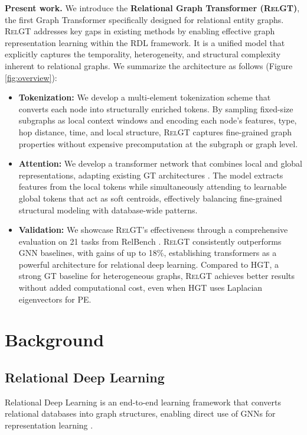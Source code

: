 \documentclass{article} %
\newcommand{\RelGT}{\textsc{RelGT}\xspace}
\begin{document}
\textbf{Present work.} We introduce the \textbf{Relational Graph Transformer (\RelGT)}, the first Graph Transformer specifically designed for relational entity graphs. \RelGT addresses key gaps in existing methods by enabling effective graph representation learning within the RDL framework. It is a unified model that explicitly captures the temporality, heterogeneity, and structural complexity inherent to relational graphs. We summarize the architecture as follows (Figure \ref{fig:overview}):
\begin{itemize}[leftmargin=*]
    \item \textbf{Tokenization:} We develop a multi-element tokenization scheme that converts each node into structurally enriched tokens. By sampling fixed-size subgraphs as local context windows and encoding each node's features, type, hop distance, time, and local structure, \RelGT captures fine-grained graph properties without expensive precomputation at the subgraph or graph level.
    \item \textbf{Attention:} We develop a transformer network that combines local and global representations, adapting existing GT architectures \citep{rampavsek2022recipe}. The model extracts features from the local tokens while simultaneously attending to learnable global tokens that act as soft centroids, effectively balancing fine-grained structural modeling with database-wide patterns.
    \item \textbf{Validation:} We showcase \RelGT's effectiveness through a comprehensive evaluation on 21 tasks from RelBench \citep{robinson2025relbench}. \RelGT consistently outperforms GNN baselines, with gains of up to 18\%, establishing transformers as a powerful architecture for relational deep learning. Compared to HGT, 
    a strong GT baseline for heterogeneous graphs, \RelGT achieves better results without added computational cost, even when HGT uses Laplacian eigenvectors for PE.
\end{itemize}




\section{Background}

\subsection{Relational Deep Learning}
\label{sec:background-rdl}
Relational Deep Learning is an end-to-end learning framework that converts relational databases into graph structures, enabling direct use of GNNs for representation learning \citep{fey2023relational}.
\end{document}
